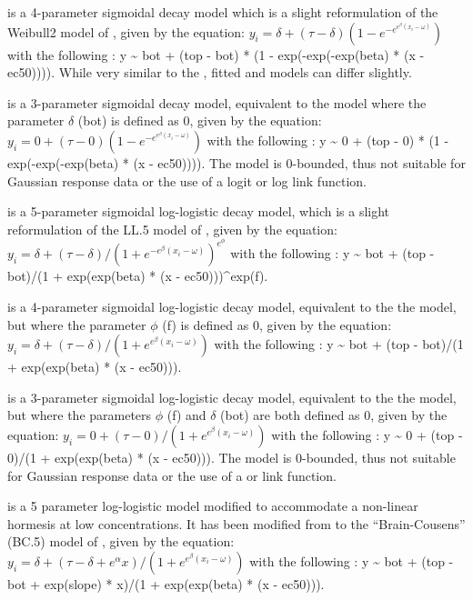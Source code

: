 \documentclass[
  shortnames]{jss}
\begin{document}
 is a 4-parameter sigmoidal decay model which is a slight reformulation of the Weibull2 model of \citet{Ritz2016}, given by the equation:
\(y_i = \delta + (\tau - \delta) (1 - e^{-e^{e^{\beta} (x_i - \omega)}})\)
with the following : y \textasciitilde{} bot + (top - bot) * (1 - exp(-exp(-exp(beta) * (x - ec50)))). While very similar to the  \citep[according to][]{Ritz2016}, fitted  and  models can differ slightly.

 is a 3-parameter sigmoidal decay model, equivalent to the  model where the parameter \(\delta\) (bot) is defined as 0, given by the equation:
\(y_i = {0} + (\tau -{0}) (1 - e^{-e^{e^{\beta} (x_i - \omega)}})\)
with the following : y \textasciitilde{} 0 + (top - 0) * (1 - exp(-exp(-exp(beta) * (x - ec50)))). The model is 0-bounded, thus not suitable for Gaussian response data or the use of a logit or log link function.

 is a 5-parameter sigmoidal log-logistic decay model, which is a slight reformulation of the LL.5 model of \citet{Ritz2016}, given by the equation:
\(y_i = \delta + (\tau - \delta) / (1 + e^{-e^{\beta} (x_i - \omega)})^{e^\phi}\)
with the following : y \textasciitilde{} bot + (top - bot)/(1 + exp(exp(beta) * (x - ec50)))\^{}exp(f).

 is a 4-parameter sigmoidal log-logistic decay model, equivalent to the the  model, but where the parameter \(\phi\) (f) is defined as 0, given by the equation:
\(y_i = \delta + (\tau - \delta)/ (1 + e^{e^{\beta} (x_i - \omega)})\)
with the following : y \textasciitilde{} bot + (top - bot)/(1 + exp(exp(beta) * (x - ec50))).

 is a 3-parameter sigmoidal log-logistic decay model, equivalent to the the  model, but where the parameters \(\phi\) (f) and \(\delta\) (bot) are both defined as 0, given by the equation:
\(y_i = 0 + (\tau - 0)/ (1 + e^{e^{\beta} (x_i - \omega)})\)
with the following : y \textasciitilde{} 0 + (top - 0)/(1 + exp(exp(beta) * (x - ec50))).
The model is 0-bounded, thus not suitable for Gaussian response data or the use of a  or  link function.

 is a 5 parameter log-logistic model modified to accommodate a non-linear hormesis at low concentrations. It has been modified from to the ``Brain-Cousens'' (BC.5) model of \citet{Ritz2016}, given by the equation:
\(y_i = \delta + (\tau - \delta + e^{\alpha} x)/ (1 + e^{e^{\beta} (x_i - \omega)})\)
with the following : y \textasciitilde{} bot + (top - bot + exp(slope) * x)/(1 + exp(exp(beta) * (x - ec50))).
\end{document}
